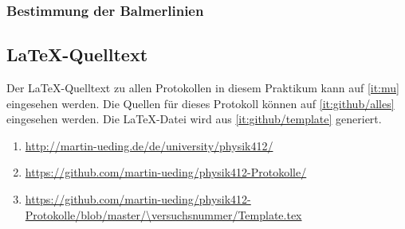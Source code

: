 \subsubsection{Bestimmung der Balmerlinien}


\begin{appendix}
    \section{\LaTeX-Quelltext}

    Der \LaTeX-Quelltext zu allen Protokollen in diesem Praktikum kann auf
    \ref{it:mu} eingesehen werden. Die Quellen für dieses Protokoll können auf
    \ref{it:github/alles} eingesehen werden. Die \LaTeX-Datei wird aus
    \ref{it:github/template} generiert.

    \begin{enumerate}
        \item
            \label{it:mu}
            \url{http://martin-ueding.de/de/university/physik412/}
        \item
            \label{it:github/alles}
            \url{https://github.com/martin-ueding/physik412-Protokolle/}
        \item
            \label{it:github/template}
            \url{https://github.com/martin-ueding/physik412-Protokolle/blob/master/\versuchsnummer/Template.tex}
    \end{enumerate}
\end{appendix}



\FloatBarrier
\IfFileExists{\bibliographyfile}{
    
}{}




